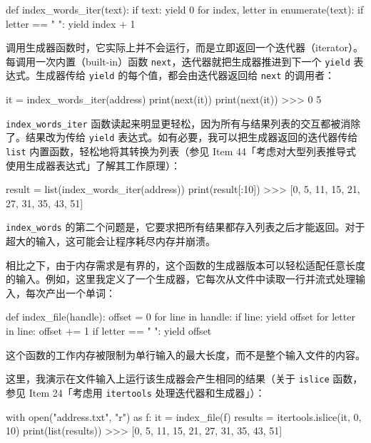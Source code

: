 \begin{codebox}[python]
def index_words_iter(text):
    if text:
        yield 0
    for index, letter in enumerate(text):
        if letter == " ":
            yield index + 1
\end{codebox}

调用生成器函数时，它实际上并不会运行，而是立即返回一个迭代器（iterator）。每调用一次内置（built-in）函数 \texttt{next}，迭代器就把生成器推进到下一个 \texttt{yield} 表达式。生成器传给 \texttt{yield} 的每个值，都会由迭代器返回给 \texttt{next} 的调用者：

\begin{codebox}[python]
it = index_words_iter(address)
print(next(it))
print(next(it))
>>>
0
5
\end{codebox}

\texttt{index\_words\_iter} 函数读起来明显更轻松，因为所有与结果列表的交互都被消除了。结果改为传给 \texttt{yield} 表达式。如有必要，我可以把生成器返回的迭代器传给 \texttt{list} 内置函数，轻松地将其转换为列表（参见 Item 44「考虑对大型列表推导式使用生成器表达式」了解其工作原理）：

\begin{codebox}[python]
result = list(index_words_iter(address))
print(result[:10])
>>>
[0, 5, 11, 15, 21, 27, 31, 35, 43, 51]
\end{codebox}

\texttt{index\_words} 的第二个问题是，它要求把所有结果都存入列表之后才能返回。对于超大的输入，这可能会让程序耗尽内存并崩溃。

相比之下，由于内存需求是有界的，这个函数的生成器版本可以轻松适配任意长度的输入。例如，这里我定义了一个生成器，它每次从文件中读取一行并流式处理输入，每次产出一个单词：

\begin{codebox}[python]
def index_file(handle):
    offset = 0
    for line in handle:
        if line:
            yield offset
        for letter in line:
            offset += 1
            if letter == " ":
                yield offset
\end{codebox}

这个函数的工作内存被限制为单行输入的最大长度，而不是整个输入文件的内容。

这里，我演示在文件输入上运行该生成器会产生相同的结果（关于 \texttt{islice} 函数，参见 Item 24「考虑用 \texttt{itertools} 处理迭代器和生成器」）：

\begin{codebox}[python]
with open("address.txt", "r") as f:
    it = index_file(f)
    results = itertools.islice(it, 0, 10)
    print(list(results))
>>>
[0, 5, 11, 15, 21, 27, 31, 35, 43, 51]
\end{codebox}


